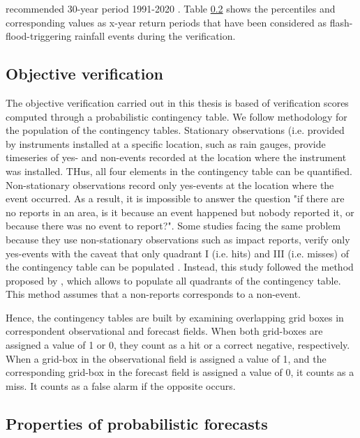 recommended 30-year period 1991-2020 \citep{WMO_2017}. Table \ref{} shows the percentiles and corresponding values as x-year return periods that have been considered as flash-flood-triggering rainfall events during the verification.


\subsection{Objective verification}

The objective verification carried out in this thesis is based of verification scores computed through a probabilistic contingency table. We follow \citet{Pillosu_2024} methodology for the population of the contingency tables. Stationary observations (i.e. provided by instruments installed at a specific location, such as rain gauges, provide timeseries of yes- and non-events recorded at the location where the instrument was installed. THus, all four elements in the contingency table can be quantified. Non-stationary observations record only yes-events at the location where the event occurred. As a result, it is impossible to answer the question "if there are no reports in an area, is it because an event happened but nobody reported it, or because there was no event to report?". Some studies facing the same problem because they use non-stationary observations such as impact reports, verify only yes-events with the caveat that only quadrant I (i.e. hits) and III (i.e. misses) of the contingency table can be populated \citep{Robbins_2018}. Instead, this study followed the method proposed by \citet{Tsonevsky_2018}, which allows to populate all quadrants of the contingency table. This method assumes that a non-reports corresponds to a non-event. 

Hence, the contingency tables are built by examining overlapping grid boxes in correspondent observational and forecast fields. When both grid-boxes are assigned a value of 1 or 0, they count as a hit or a correct negative, respectively. When a grid-box in the observational field is assigned a value of 1, and the corresponding grid-box in the forecast field is assigned a value of 0, it counts as a miss. It counts as a false alarm if the opposite occurs. 


\subsection{Properties of probabilistic forecasts}


